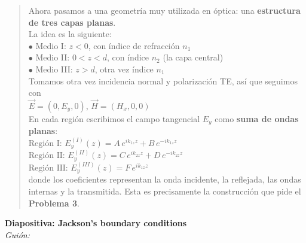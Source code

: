 \documentclass{article}
\begin{document}
\begin{quote}
Ahora pasamos a una geometría muy utilizada en óptica: una \textbf{estructura de tres capas planas}.\\[2mm]
La idea es la siguiente:\\[1mm]
\(\bullet\) Medio I: \(z<0\), con índice de refracción \(n_1\)\\
\(\bullet\) Medio II: \(0<z<d\), con índice \(n_2\) (la capa central)\\
\(\bullet\) Medio III: \(z>d\), otra vez índice \(n_1\)\\[2mm]
Tomamos otra vez incidencia normal y polarización TE, así que seguimos con\\[1mm]
\(\vec{E} = (0,E_y,0)\), \quad \(\vec{H} = (H_x,0,0)\)\\[2mm]
En cada región escribimos el campo tangencial \(E_y\) como \textbf{suma de ondas planas}:\\[1mm]
\(\text{Región I: } E_y^{(I)}(z) = A\,e^{i k_{1z} z} + B\,e^{-i k_{1z} z}\)\\
\(\text{Región II: } E_y^{(II)}(z) = C\,e^{i k_{2z} z} + D\,e^{-i k_{2z} z}\)\\
\(\text{Región III: } E_y^{(III)}(z) = F\,e^{i k_{1z} z}\)\\[2mm]
donde los coeficientes representan la onda incidente, la reflejada, las ondas internas 
y la transmitida. Esta es precisamente la construcción que pide el \textbf{Problema 3}.
\end{quote}

\vspace{0.4cm}

\noindent
\textbf{Diapositiva: Jackson's boundary conditions}\\[2mm]
\textit{Guión:}\\[2mm]
\end{document}
